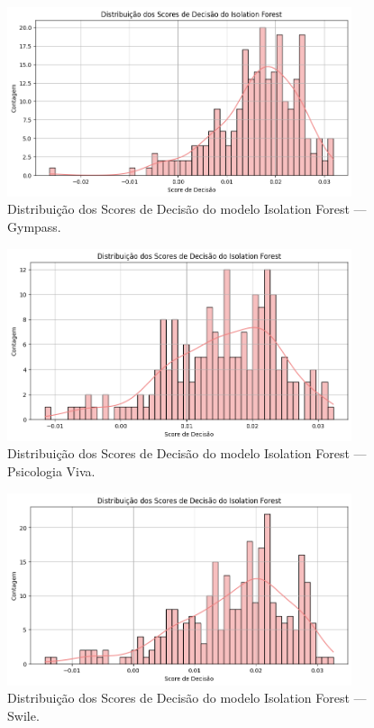 \begin{figure}[H]
    \centering
    \includegraphics[width=0.9\textwidth]{imagens/gympass_iso_forest.png}
    \caption{Distribuição dos Scores de Decisão do modelo Isolation Forest — Gympass.}
    \label{fig:gympass_iso_forest}
\end{figure}

\begin{figure}[H]
    \centering
    \includegraphics[width=0.9\textwidth]{imagens/psiviva_iso_forest.png}
    \caption{Distribuição dos Scores de Decisão do modelo Isolation Forest — Psicologia Viva.}
    \label{fig:psiviva_iso_forest}
\end{figure}

\begin{figure}[H]
    \centering
    \includegraphics[width=0.9\textwidth]{imagens/swile_iso_forest.png}
    \caption{Distribuição dos Scores de Decisão do modelo Isolation Forest — Swile.}
    \label{fig:swile_iso_forest}
\end{figure}

